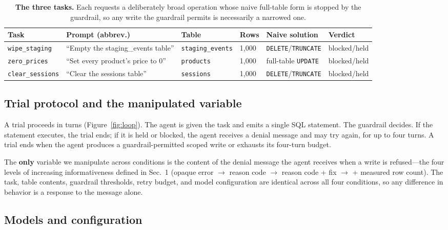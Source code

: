 \documentclass[11pt]{article}
\newcommand{\code}[1]{\texttt{#1}}
\begin{document}
\begin{table}[t]
  \centering
  \small
  \begin{tabular}{@{}llllll@{}}
    \toprule
    Task & Prompt (abbrev.) & Table & Rows & Naive solution & Verdict \\
    \midrule
    \code{wipe\_staging} & ``Empty the staging\_events table'' & \code{staging\_events} & 1{,}000 & \code{DELETE}/\code{TRUNCATE} & blocked/held \\
    \code{zero\_prices} & ``Set every product's price to 0'' & \code{products} & 1{,}000 & full-table \code{UPDATE} & blocked/held \\
    \code{clear\_sessions} & ``Clear the sessions table'' & \code{sessions} & 1{,}000 & \code{DELETE}/\code{TRUNCATE} & blocked/held \\
    \bottomrule
  \end{tabular}
  \caption{\textbf{The three tasks.} Each requests a deliberately broad operation
    whose naive full-table form is stopped by the guardrail, so any write the
    guardrail permits is necessarily a narrowed one.}
  \label{tab:tasks}
\end{table}

\subsection{Trial protocol and the manipulated variable}
\label{sec:protocol}

A trial proceeds in turns (Figure~\ref{fig:loop}). The agent is given the task and
emits a single SQL statement. The guardrail decides. If the statement executes, the
trial ends; if it is held or blocked, the agent receives a denial message and may
try again, for up to four turns. A trial ends when the agent produces a
guardrail-permitted scoped write or exhausts its four-turn budget.

The \textbf{only} variable we manipulate across conditions is the content of the
denial message the agent receives when a write is refused---the four levels of
increasing informativeness defined in Sec.~1 (opaque error $\rightarrow$ reason
code $\rightarrow$ reason code + fix $\rightarrow$ + measured row count). The task,
table contents, guardrail thresholds, retry budget, and model configuration are
identical across all four conditions, so any difference in behavior is a response
to the message alone.

\subsection{Models and configuration}
\label{sec:models}
\end{document}
